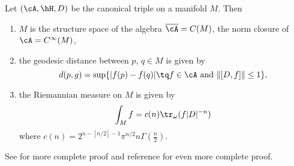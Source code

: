 \begin{theorem}
	Let $(\cA,\hH,D)$ be the canonical triple on a manifold $M$. Then
	\begin{enumerate}
		\item $M$ is the structure space of the algebra $\overline{ \cA }=C(M)$, the norm closure of $\cA= C^{\infty}(M)$,
		\item the geodesic distance between $p$, $q\in M$ is given by
		      \begin{equation} \label{eq_defdtriple}
			      d(p,g)=\sup\{ | f(p)-f(q) |\tq f\in\cA\text{ and }\| [D,f] \|\leq 1 \},
		      \end{equation}
		\item the Riemannian measure on $M$ is given by
		      \begin{equation}
			      \int_M f=c(n)\tr_{\omega}(f| D |^{-n})
		      \end{equation}
		      where $c(n)=2^{n-[n/2]-1}\pi^{n/2}n\Gamma(\frac{ n }{2})$.
	\end{enumerate}

\end{theorem}

See \cite{Landi} for more complete proof and reference for even more complete proof.

